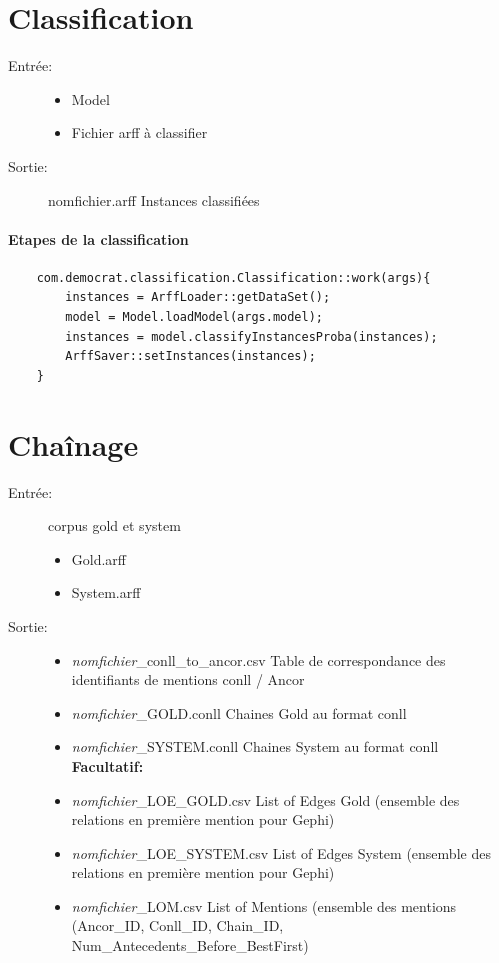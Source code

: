 \documentclass[a4paper,10pt]{report}
\begin{document}
  \section{Classification}
    \begin{description}
     \item[Entrée:]\hfill
     \begin{itemize}
	  \item Model \item Fichier arff à classifier
     \end{itemize}
     \item[Sortie:] nomfichier.arff \textrightarrow  Instances classifiées 
    \end{description}
    \paragraph{Etapes de la classification}
    \begin{verbatim}
    com.democrat.classification.Classification::work(args){
        instances = ArffLoader::getDataSet();
        model = Model.loadModel(args.model);
        instances = model.classifyInstancesProba(instances);
        ArffSaver::setInstances(instances);
    }
    \end{verbatim}

  \section{Chaînage}
    \begin{description}
     \item[Entrée:] corpus gold et system
      \begin{itemize}
       \item Gold.arff
       \item System.arff
      \end{itemize}
     \item[Sortie:]\hfill
     \begin{itemize}
      \item \emph{nomfichier}\_conll\_to\_ancor.csv \textrightarrow  Table de correspondance des identifiants de mentions conll / Ancor
      \item \emph{nomfichier}\_GOLD.conll \textrightarrow  Chaines Gold au format conll  
      \item \emph{nomfichier}\_SYSTEM.conll \textrightarrow  Chaines System au format conll\\
      \textbf{Facultatif:}
      \item \emph{nomfichier}\_LOE\_GOLD.csv \textrightarrow List of Edges Gold (ensemble des relations en première mention pour Gephi)
      \item \emph{nomfichier}\_LOE\_SYSTEM.csv \textrightarrow List of Edges System (ensemble des relations en première mention pour Gephi)
      \item \emph{nomfichier}\_LOM.csv \textrightarrow List of Mentions (ensemble des mentions (Ancor\_ID, Conll\_ID, Chain\_ID, Num\_Antecedents\_Before\_BestFirst)
     \end{itemize}
    \end{description}
\end{document}
